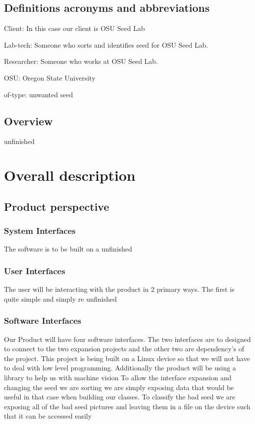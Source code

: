 \documentclass[onecolumn, draftclsnofoot,10pt, compsoc]{IEEEtran}
\begin{document}
\subsection{Definitions acronyms and abbreviations}

Client: In this case our client is OSU Seed Lab

Lab-tech: Someone who sorts and identifies seed for OSU Seed Lab.

Researcher: Someone who works at OSU Seed Lab.

OSU: Oregon State University

of-type: unwanted seed

\subsection{Overview}
unfinished

\section{Overall description}

\subsection{Product perspective}

\subsubsection{System Interfaces}
The software is to be built on a
unfinished
\subsubsection{User Interfaces}
The user will be interacting with the product in 2 primary ways.
The first is quite simple and simply re
unfinished
\subsubsection{Software Interfaces}
Our Product will have four software interfaces.
The two interfaces are to designed to connect to the two expansion projects and the other two are dependency's of the project.
This project is being built on a Linux device so that we will not have to deal with low level programming.
Additionally the product will be using a library to help us with machine vision
To allow the interface expansion and changing the seed we are sorting we are simply exposing data that would be useful in that case when building our classes.
To classify the bad seed we are exposing all of the bad seed pictures and leaving them in a file on the device such that it can be accessed easily
\end{document}
